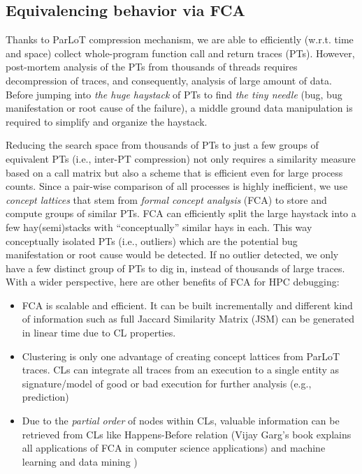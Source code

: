 \clearpage

\subsection{Equivalencing behavior via FCA}
\label{subsec:fca}

Thanks to ParLoT compression mechanism, we are able to efficiently (w.r.t. time and space) collect whole-program function call and return traces (PTs). However, post-mortem analysis of the PTs from thousands of threads requires decompression of traces, and consequently, analysis of large amount of data. Before jumping into \textit{the huge haystack} of PTs to find \textit{the tiny needle} (bug, bug manifestation or root cause of the failure), a middle ground data manipulation is required to simplify and organize the haystack. 

Reducing the search space from thousands of PTs to just a few groups of equivalent PTs (i.e., inter-PT compression) not only requires a similarity measure based on a call matrix but also a scheme that is efficient even for large process counts.
%
Since a pair-wise comparison of all processes is highly inefficient, we use \textit{concept lattices} that stem from \textit{formal concept analysis} (FCA) \cite{clbook} to store and compute groups of similar PTs.
%
FCA can efficiently split the large haystack into a few hay(semi)stacks with ``conceptually'' similar hays in each. This way conceptually isolated PTs (i.e., outliers) which are the potential bug manifestation or root cause would be detected. If no outlier detected, we only have a few distinct group of PTs to dig in, instead of thousands of large traces. With a wider perspective, here are other benefits of FCA for HPC debugging:
\begin{itemize}
\item FCA is scalable and efficient. It can be built incrementally and different kind of information such as full Jaccard Similarity Matrix (JSM) can be generated in linear time due to CL properties.
\item Clustering is only one advantage of creating concept lattices from ParLoT traces. CLs can integrate all traces from an execution to a single entity as signature/model of good or bad execution for further analysis (e.g., prediction) 
\item Due to the \textit{partial order} of nodes within CLs, valuable information can be retrieved from CLs like Happens-Before relation (Vijay Garg’s book explains all applications of FCA in computer science applications)\cite{latticeForDistConst} and machine learning and data mining \cite{Ignatov17})
\end{itemize}

